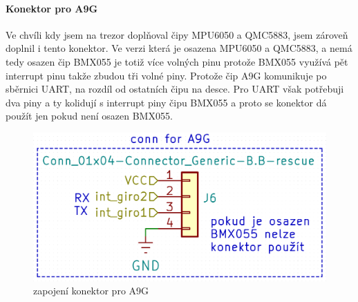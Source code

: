 \newpage

\paragraph{Konektor pro A9G}
Ve chvíli kdy jsem na trezor doplňoval čipy MPU6050 a QMC5883, jsem zároveň doplnil i tento konektor. Ve verzi která je osazena MPU6050 a QMC5883, a nemá tedy osazen čip BMX055 je totiž více
volných pinu protože BMX055 využívá pět interrupt pinu takže zbudou tři volné piny. Protože čip A9G komunikuje po sběrnici UART, na rozdíl od ostatních čipu na desce. Pro UART však potřebuji
dva piny a ty kolidují s interrupt piny čipu BMX055 a proto se konektor dá použít jen pokud není osazen BMX055.

\begin{figure}[htbp]
    \centering
    \includegraphics[width=\textwidth]{kapitoly/obrazky/E4/vnimani/conn-A9G.png}
    \caption{zapojení konektor pro A9G}
    \label{fig:E4-A9G}
\end{figure}

\newpage
